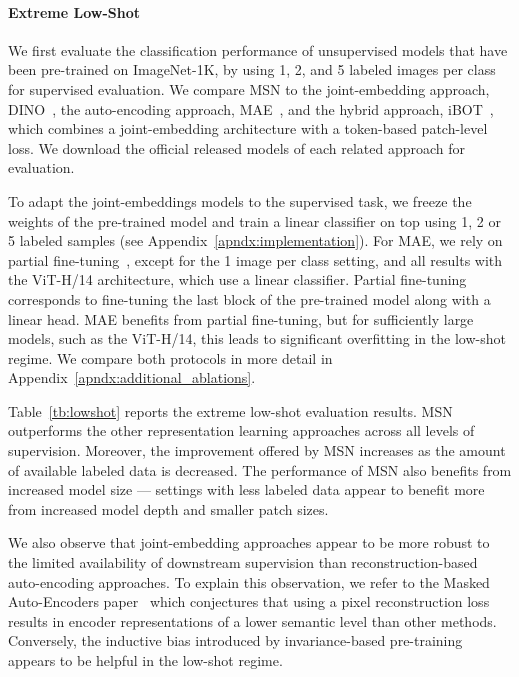 \documentclass{article}
\begin{document}
\paragraph{Extreme Low-Shot}
We first evaluate the classification performance of unsupervised models that have been pre-trained on ImageNet-1K, by using 1, 2, and 5 labeled images per class for supervised evaluation. We compare MSN to the joint-embedding approach, DINO~\citep{caron2021emerging}, the auto-encoding approach, MAE~\citep{he2021masked}, and the hybrid approach, iBOT~\citep{zhou2021ibot}, which combines a joint-embedding architecture with a token-based patch-level loss.
We download the official released models of each related approach for evaluation.

To adapt the joint-embeddings models to the supervised task, we freeze the weights of the pre-trained model and train a linear classifier on top using 1, 2 or 5 labeled samples (see Appendix~\ref{apndx:implementation}).
For MAE, we rely on partial fine-tuning~\citep{he2021masked}, except for the 1 image per class setting, and all results with the ViT-H/14 architecture, which use a linear classifier.
Partial fine-tuning corresponds to fine-tuning the last block of the pre-trained model along with a linear head. MAE benefits from partial fine-tuning, but for sufficiently large models, such as the ViT-H/14, this leads to significant overfitting in the low-shot regime. We compare both protocols in more detail in Appendix~\ref{apndx:additional_ablations}. 

Table~\ref{tb:lowshot} reports the extreme low-shot evaluation results.
MSN outperforms the other representation learning approaches across all levels of supervision.
Moreover, the improvement offered by MSN increases as the amount of available labeled data is decreased.
The performance of MSN also benefits from increased model size --- settings with less labeled data appear to benefit more from increased model depth and smaller patch sizes.

We also observe that joint-embedding approaches appear to be more robust to the limited availability of downstream supervision than reconstruction-based auto-encoding approaches.
To explain this observation, we refer to the Masked Auto-Encoders paper~\citep{he2021masked} which conjectures that using a pixel reconstruction loss results in encoder representations of a lower semantic level than other methods.
Conversely, the inductive bias introduced by invariance-based pre-training appears to be helpful in the low-shot regime.
\end{document}
